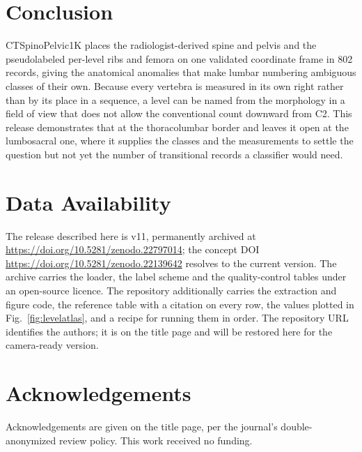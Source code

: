 \documentclass[aapm,mph,amsmath,amssymb,preprint,linenumbers]{revtex4-2}
\newcommand{\datasetdoi}{10.5281/zenodo.22139642}
\newcommand{\datasetversiondoi}{10.5281/zenodo.22797014}
\newcommand{\datasetversion}{v11}
\newif\ifreview \reviewtrue
\newcommand{\doiurl}[1]{\url{https://doi.org/#1}}
\begin{document}
\section{Conclusion}

CTSpinoPelvic1K places the radiologist-derived spine and pelvis and the pseudolabeled per-level
ribs and femora on one validated coordinate frame in 802 records, giving the anatomical
anomalies that make lumbar numbering ambiguous classes of their own.
Because every vertebra is measured in its own right rather than by its place in a sequence, a
level can be named from the morphology in a field of view that does not allow the
conventional count downward from C2. This release demonstrates that at the thoracolumbar
border and leaves it open at the lumbosacral one, where it supplies the classes and the
measurements to settle the question but not yet the number of transitional records a
classifier would need. 

\section*{Data Availability}
The release described here is \datasetversion{}, permanently archived at
\doiurl{\datasetversiondoi}; the concept DOI \doiurl{\datasetdoi} resolves to the
current version.
The archive carries the loader, the label scheme and the quality-control tables under an
open-source licence. The repository additionally carries the extraction and figure code,
the reference table with a citation on every row, the values plotted in
Fig.~\ref{fig:levelatlas}, and a recipe for running them in order. \ifreview The
repository URL identifies the authors; it is on the title page and will be restored here for
the camera-ready version.\else Code:
\url{https://github.com/OpenSpineConsortium/CTSpinoPelvic1K} (article materials under
\texttt{paper/mpda/}); convenience mirror:
\url{https://huggingface.co/datasets/OpenSpineConsortium/CTSpinoPelvic1K}; measurement
toolkit: \url{https://github.com/OpenSpineConsortium/OpenSpineToolkit}.\fi

\section*{Acknowledgements}
Acknowledgements are given on the title page, per the journal's double-anonymized review
policy. This work received no funding.
\end{document}

